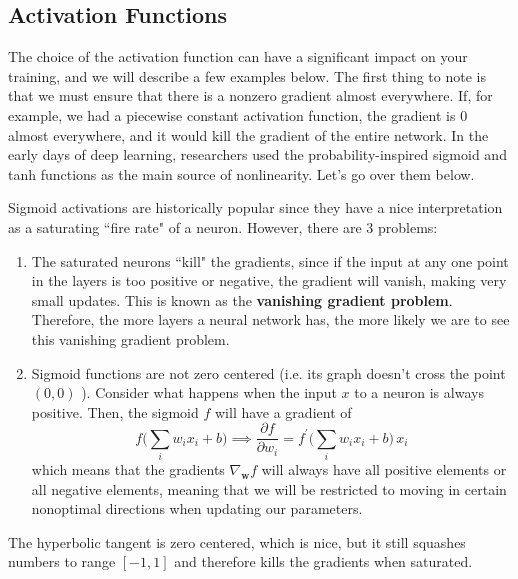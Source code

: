 \documentclass{article}
\begin{document}
    \begin{definition}[L-BFGS]
      
    \end{definition}

  \subsection{Activation Functions} 

    The choice of the activation function can have a significant impact on your training, and we will describe a few examples below. The first thing to note is that we must ensure that there is a nonzero gradient almost everywhere. If, for example, we had a piecewise constant activation function, the gradient is $0$ almost everywhere, and it would kill the gradient of the entire network. In the early days of deep learning, researchers used the probability-inspired sigmoid and tanh functions as the main source of nonlinearity. Let's go over them below. 

    \begin{definition}[Sigmoid]
      Sigmoid activations are historically popular since they have a nice interpretation as a saturating ``fire rate" of a neuron. However, there are 3 problems: 
      \begin{enumerate}
          \item The saturated neurons ``kill" the gradients, since if the input at any one point in the layers is too positive or negative, the gradient will vanish, making very small updates. This is known as the \textbf{vanishing gradient problem}. Therefore, the more layers a neural network has, the more likely we are to see this vanishing gradient problem. 
          \item Sigmoid functions are not zero centered (i.e. its graph doesn't cross the point $(0, 0)$ ). Consider what happens when the input $x$ to a neuron is always positive. Then, the sigmoid $f$ will have a gradient of 
          \[f \bigg( \sum_i w_i x_i + b \bigg) \implies \frac{\partial f}{\partial w_i} = f^\prime \bigg( \sum_i w_i x_i + b \bigg) 
          \, x_i\]
          which means that the gradients $\nabla_\mathbf{w} f$ will always have all positive elements or all negative elements, meaning that we will be restricted to moving in certain nonoptimal directions when updating our parameters. 
      \end{enumerate}
    \end{definition}

    \begin{definition}
      The hyperbolic tangent is zero centered, which is nice, but it still squashes numbers to range $[-1, 1]$ and therefore kills the gradients when saturated. 
    \end{definition}
\end{document}
